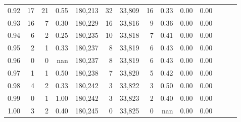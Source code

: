 \begin{tabular}{rrrrrrrrrrrrrr}
0.92 &     17 &   21 &  0.55 &  180,213 &       32 &  33,809 &      16 &  0.33 &  0.00 &      0.00 \\
0.93 &     16 &    7 &  0.30 &  180,229 &       16 &  33,816 &       9 &  0.36 &  0.00 &      0.00 \\
0.94 &      6 &    2 &  0.25 &  180,235 &       10 &  33,818 &       7 &  0.41 &  0.00 &      0.00 \\
0.95 &      2 &    1 &  0.33 &  180,237 &        8 &  33,819 &       6 &  0.43 &  0.00 &      0.00 \\
0.96 &      0 &    0 &   nan &  180,237 &        8 &  33,819 &       6 &  0.43 &  0.00 &      0.00 \\
0.97 &      1 &    1 &  0.50 &  180,238 &        7 &  33,820 &       5 &  0.42 &  0.00 &      0.00 \\
0.98 &      4 &    2 &  0.33 &  180,242 &        3 &  33,822 &       3 &  0.50 &  0.00 &      0.00 \\
0.99 &      0 &    1 &  1.00 &  180,242 &        3 &  33,823 &       2 &  0.40 &  0.00 &      0.00 \\
1.00 &      3 &    2 &  0.40 &  180,245 &        0 &  33,825 &       0 &   nan &  0.00 &      0.00 \\
\bottomrule
\end{tabular}
